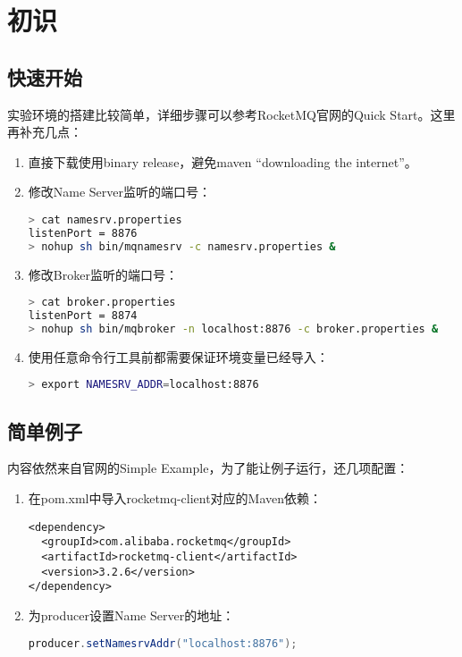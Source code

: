 \section{初识}

\subsection{快速开始}

实验环境的搭建比较简单，详细步骤可以参考RocketMQ官网的Quick Start\cite{quick-start}。这里再补充几点：

\begin{enumerate}[itemindent=1em]

\item 直接下载使用binary release，避免maven “downloading the internet”。

\item 修改Name Server监听的端口号：
\begin{lstlisting}[language=sh, style=customStyleBashLight]
> cat namesrv.properties
listenPort = 8876
> nohup sh bin/mqnamesrv -c namesrv.properties &
\end{lstlisting}

\item 修改Broker监听的端口号：
\begin{lstlisting}[language=sh, style=customStyleBashLight]
> cat broker.properties
listenPort = 8874
> nohup sh bin/mqbroker -n localhost:8876 -c broker.properties &
\end{lstlisting}

\item 使用任意命令行工具前都需要保证环境变量已经导入：
\begin{lstlisting}[language=sh, style=customStyleBashLight]
> export NAMESRV_ADDR=localhost:8876
\end{lstlisting}

\end{enumerate} 



\subsection{简单例子}
内容依然来自官网的Simple Example\cite{simple-example}，为了能让例子运行，还几项配置：

\begin{enumerate}[itemindent=1em]

\item 在pom.xml中导入rocketmq-client对应的Maven依赖：
\begin{lstlisting}[style=customStyleHTMLLight]
<dependency>
  <groupId>com.alibaba.rocketmq</groupId>
  <artifactId>rocketmq-client</artifactId>
  <version>3.2.6</version>
</dependency>
\end{lstlisting}

\item 为producer设置Name Server的地址：
\begin{lstlisting}[language=Java, style=customStyleJavaLight]
producer.setNamesrvAddr("localhost:8876");

\end{lstlisting}

\end{enumerate} 


